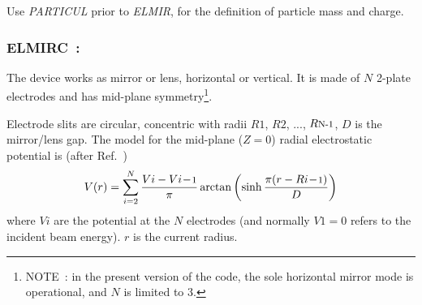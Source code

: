 \medskip

\noindent Use \textsl{PARTICUL} prior to \textsl{ELMIR}, for the
 definition of particle mass and charge.

\bigskip
\vfill

\begin{figure}[H]
\centerline{}
\hangcaption{\label{figELMIR} \CapELMIR}
\end{figure}

\vfill

\newpage

\subsubsection*{ELMIRC~: \ELMIRCTitl~\cite{Karets}}\label{ELMIRC}
\medskip

The device works as  mirror or lens, horizontal or vertical. 
It is made of $N$ 2-plate electrodes and has mid-plane 
symmetry\footnote{NOTE~: in the present version of the code, the sole horizontal mirror mode 
 is operational, and $N$ is limited to 3.}. 

\medskip

\noindent Electrode  slits are circular, concentric with  radii  $ R1 $, $ R2 $, ...,   
$ R{\textrm{\footnotesize N-1}}$, 
$D$ is the  mirror/lens gap. The model for the mid-plane ($Z=0$) radial electrostatic potential  
is (after Ref.~\cite[p.443]{Karets})
$$ V(r) = 
   \sum_{i=2}^{N} \dfrac{V{i}-V{i\!-\!\textrm{\footnotesize 1}} }{ \pi} 
     \arctan \left( \sinh \dfrac{ \pi ( r - R{i\!-\!\textrm{\footnotesize 1}})}{D} \right)  
$$
where $V\!i$ are the potential at the $N$ electrodes (and normally $V\!1=0$ refers to
the incident beam energy). $r$ is the current radius. 

